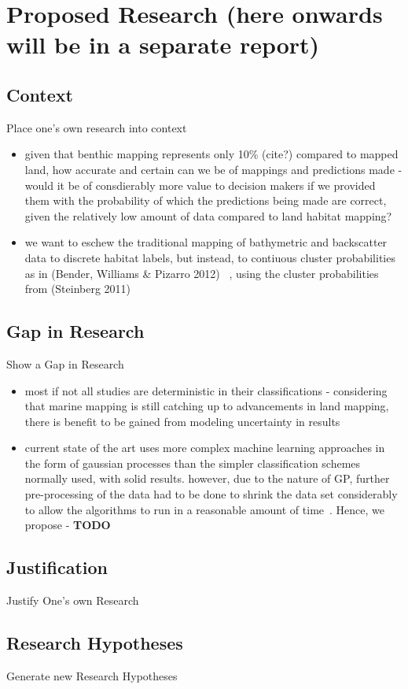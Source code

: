 \documentclass[12pt]{article}
\begin{document}
\section{Proposed Research (here onwards will be in a separate report)}
\subsection{Context}
Place one's own research into context
\begin{itemize}
\item given that benthic mapping represents only 10\% (cite?) compared to mapped land, how accurate and certain can we be of mappings and predictions made - would it be of consdierably more value to decision makers if we provided them with the probability of which the predictions being made are correct, given the relatively low amount of data compared to land habitat mapping?
\item we want to eschew the traditional mapping of bathymetric and backscatter data to discrete habitat labels, but instead, to contiuous cluster probabilities as in (Bender, Williams \& Pizarro 2012) ~\citep{bender12}, using the cluster probabilities from (Steinberg 2011) ~\citep{steinberg11}
\end{itemize}

\subsection{Gap in Research}
Show a Gap in Research
\begin{itemize}
\item most if not all studies are deterministic in their classifications - considering that marine mapping is still catching up to advancements in land mapping, there is benefit to be gained from modeling uncertainty in results
\item current state of the art uses more complex machine learning approaches in the form of gaussian processes than the simpler classification schemes normally used, with solid results. however, due to the nature of GP, further pre-processing of the data had to be done to shrink the data set considerably to allow the algorithms to run in a reasonable amount of time~\citep{bender12}. Hence, we propose - \textbf{TODO}
\end{itemize}

\subsection{Justification}
Justify One's own Research

\subsection{Research Hypotheses}
Generate new Research Hypotheses



\end{document}
